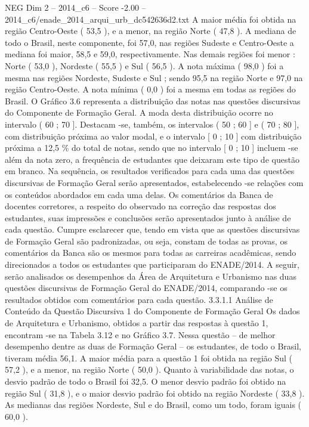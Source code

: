 \begin{textsample}{NEG Dim 2 – 2014\_c6 – Score -2.00 – 2014\_c6/enade\_2014\_arqui\_urb\_dc542636d2.txt}
A maior média foi obtida na região Centro-Oeste ( 53,5 ), e a menor, na região Norte ( 47,8 ).
A mediana de todo o Brasil, neste componente, foi 57,0, nas regiões Sudeste e Centro-Oeste a mediana foi maior, 58,5 e 59,0, respectivamente.
Nas demais regiões foi menor : Norte ( 53,0 ), Nordeste ( 55,5 ) e Sul ( 56,5 ).
A nota máxima ( 98,0 ) foi a mesma nas regiões Nordeste, Sudeste e Sul ; sendo 95,5 na região Norte e 97,0 na região Centro-Oeste.
A nota mínima ( 0,0 ) foi a mesma em todas as regiões do Brasil.
O Gráfico 3.6 representa a distribuição das notas nas questões discursivas do Componente de Formação Geral.
A moda desta distribuição ocorre no intervalo ( 60 ; 70 ].
Destacam -se, também, os intervalos ( 50 ; 60 ] e ( 70 ; 80 ], com distribuição próxima ao valor modal, e o intervalo [ 0 ; 10 ] com distribuição próxima a 12,5 \% do total de notas, sendo que no intervalo [ 0 ; 10 ] incluem -se além da nota zero, a frequência de estudantes que deixaram este tipo de questão em branco.
Na sequência, os resultados verificados para cada uma das questões discursivas de Formação Geral serão apresentados, estabelecendo -se relações com os conteúdos abordados em cada uma delas.
Os comentários da Banca de docentes corretores, a respeito do observado na correção das respostas dos estudantes, suas impressões e conclusões serão apresentados junto à análise de cada questão.
Cumpre esclarecer que, tendo em vista que as questões discursivas de Formação Geral são padronizadas, ou seja, constam de todas as provas, os comentários da Banca são os mesmos para todas as carreiras acadêmicas, sendo direcionados a todos os estudantes que participaram do ENADE/2014.
A seguir, serão analisados os desempenhos da Área de Arquitetura e Urbanismo nas duas questões discursivas de Formação Geral do ENADE/2014, comparando -se os resultados obtidos com comentários para cada questão. 3.3.1.1 Análise de Conteúdo da Questão Discursiva 1 do Componente de Formação Geral Os dados de Arquitetura e Urbanismo, obtidos a partir das respostas à questão 1, encontram -se na Tabela 3.12 e no Gráfico 3.7.
Nessa questão – de melhor desempenho dentre as duas de Formação Geral – os estudantes, de todo o Brasil, tiveram média 56,1.
A maior média para a questão 1 foi obtida na região Sul ( 57,2 ), e a menor, na região Norte ( 50,0 ).
Quanto à variabilidade das notas, o desvio padrão de todo o Brasil foi 32,5.
O menor desvio padrão foi obtido na região Sul ( 31,8 ), e o maior desvio padrão foi obtido na região Nordeste ( 33,8 ).
As medianas das regiões Nordeste, Sul e do Brasil, como um todo, foram iguais ( 60,0 ).

\end{textsample}
